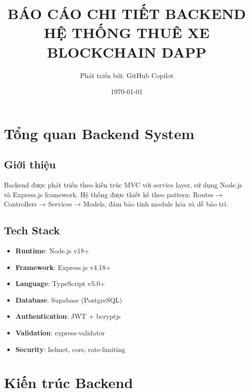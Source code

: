 \documentclass[12pt,a4paper]{article}
\title{\textbf{BÁO CÁO CHI TIẾT BACKEND} \\ 
       \textbf{HỆ THỐNG THUÊ XE BLOCKCHAIN DAPP}}
\author{Phát triển bởi: GitHub Copilot}
\date{\today}
\begin{document}
\maketitle
\tableofcontents
\newpage

\section{Tổng quan Backend System}

\subsection{Giới thiệu}
Backend được phát triển theo kiến trúc MVC với service layer, sử dụng Node.js và Express.js framework. Hệ thống được thiết kế theo pattern: Routes → Controllers → Services → Models, đảm bảo tính module hóa và dễ bảo trì.

\subsection{Tech Stack}
\begin{itemize}
    \item \textbf{Runtime}: Node.js v18+
    \item \textbf{Framework}: Express.js v4.18+
    \item \textbf{Language}: TypeScript v5.0+
    \item \textbf{Database}: Supabase (PostgreSQL)
    \item \textbf{Authentication}: JWT + bcryptjs
    \item \textbf{Validation}: express-validator
    \item \textbf{Security}: helmet, cors, rate-limiting
\end{itemize}

\section{Kiến trúc Backend}
\end{document}
